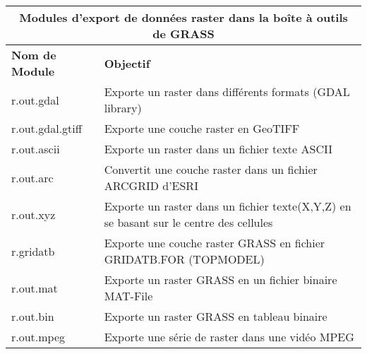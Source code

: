 \begin{table}[H]
\centering
 \begin{tabular}{|p{2.5cm}|p{11.5cm}|}
  \hline \multicolumn{2}{|c|}{\textbf{Modules d'export de données raster dans la boîte à outils de GRASS}} \\ 
  \hline \textbf{Nom de Module} & \textbf{Objectif} \\
  \hline r.out.gdal & Exporte un raster dans différents formats (GDAL library) \\
  \hline r.out.gdal.gtiff & Exporte une couche raster en GeoTIFF \\
  \hline r.out.ascii & Exporte un raster dans un fichier texte ASCII \\
  \hline r.out.arc & Convertit une couche raster dans un fichier ARCGRID d'ESRI \\
  \hline r.out.xyz & Exporte un raster dans un fichier texte(X,Y,Z) en se basant sur le centre des cellules \\
  \hline r.gridatb & Exporte une couche raster GRASS en fichier GRIDATB.FOR (TOPMODEL) \\
  \hline r.out.mat & Exporte un raster GRASS en un fichier binaire MAT-File \\
  \hline r.out.bin & Exporte un raster GRASS en tableau binaire \\
  \hline r.out.mpeg & Exporte une série de raster dans une vidéo MPEG \\

\end{tabular}
\end{table}
